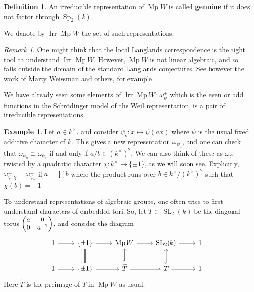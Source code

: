 \documentclass[11pt,a4paper,leqno]{article}
\newcommand{\1}{\mathbbm{1}}
\DeclareMathOperator{\Irr}{Irr}
\DeclareMathOperator{\SL}{SL}
\DeclareMathOperator{\Sp}{Sp}
\DeclareMathOperator{\Mp}{Mp}
\theoremstyle{plain}
\theoremstyle{definition}
\newtheorem{definition}[theorem]{Definition}
\newtheorem{example}[theorem]{Example}
\theoremstyle{remark}
\newtheorem*{remark}{Remark}
\numberwithin{equation}{section}
\begin{document}
\begin{definition}
  An irreducible representation of $\Mp W$ is called \textbf{genuine}
  if it does not factor through $\Sp_{2}(k)$. 
\end{definition}
We denote by $\Irr \Mp W$ the set of such representations.
\begin{remark}
  One might think that the local Langlands correspondence is the right
  tool to understand $\Irr \Mp W$. However, $\Mp W$ is not linear
  algebraic, and so falls outside the domain of the standard Langlands
  conjectures. See however the work of Marty Weissman and others, for example
  \cite{weissman2018}. 
\end{remark}
We have already seen some elements of $\Irr \Mp W$: $\omega_{\psi}^{\pm}$ which
is the even or odd functions in the Schrödinger model of the Weil
representation, is a pair of irreducible representations.
\begin{example}
  Let $a \in k^{\times}$, and consider $\psi_{a} \colon x \mapsto \psi(ax)$ where $\psi$ is
  the usual fixed additive character of $k$. This gives a new
  representation $\omega_{\psi_{a}}$, and one can check that $\omega_{\psi_{a}}\cong
  \omega_{\psi_{b}}$ if and only if $a/b \in (k^{\times})^{2}$. We can also think of
  these as $\omega_{\psi}$ twisted by a quadratic character $\chi : k^{\times} \to \{\pm
  1\}$, as we will soon see. Explicitly, $\omega_{\psi,\chi}^{\pm} = \omega_{\psi_{a}}^{\pm}$
  if $a = \prod b$ where the product runs over $b \in k^{\times}/(k^{\times})^{2}$
  such that $\chi(b) = -1$.
\end{example}

To understand representations of algebraic groups, one often tries to
first understand characters of embedded tori. So, let $T \subset \SL_{2}(k)$
be the diagonal torus $\mqty(a  & 0 \\ 0 & a^{-1})$, and consider the
diagram 
\begin{equation}
  \label{eq:17}
\begin{tikzcd}
1  \arrow[r] & \{\pm 1\} \arrow[r]                                & \Mp W \arrow[r]                        & \SL_2 (k) \arrow[r]           & 1 \\
1 \arrow[r]  & \{\pm 1\} \arrow[r] \arrow[u, Rightarrow, no head ] & \widetilde T \arrow[r] \arrow[u, hook] & T \arrow[r] \arrow[u, hook] & 1
\end{tikzcd}
\end{equation}
Here $\widetilde T$ is the preimage of $T$ in $\Mp W$ as usual.
\end{document}
